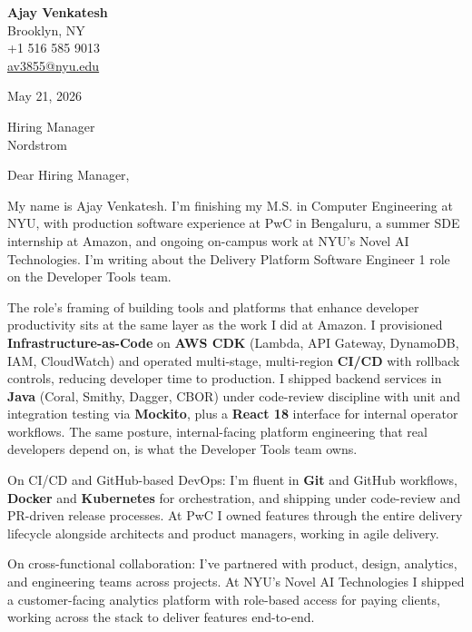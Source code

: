 \documentclass[letterpaper,11pt]{article}
\begin{document}
\begin{flushleft}
\textbf{\large Ajay Venkatesh} \\
Brooklyn, NY \\
+1 516 585 9013 \\
\href{mailto:av3855@nyu.edu}{av3855@nyu.edu}
\end{flushleft}
\vspace{10pt}
May 21, 2026
\vspace{6pt}

Hiring Manager \\
Nordstrom

\vspace{10pt}

Dear Hiring Manager,

My name is Ajay Venkatesh. I'm finishing my M.S. in Computer Engineering at NYU, with production software experience at PwC in Bengaluru, a summer SDE internship at Amazon, and ongoing on-campus work at NYU's Novel AI Technologies. I'm writing about the Delivery Platform Software Engineer 1 role on the Developer Tools team.

The role's framing of building tools and platforms that enhance developer productivity sits at the same layer as the work I did at Amazon. I provisioned \textbf{Infrastructure-as-Code} on \textbf{AWS CDK} (Lambda, API Gateway, DynamoDB, IAM, CloudWatch) and operated multi-stage, multi-region \textbf{CI/CD} with rollback controls, reducing developer time to production. I shipped backend services in \textbf{Java} (Coral, Smithy, Dagger, CBOR) under code-review discipline with unit and integration testing via \textbf{Mockito}, plus a \textbf{React 18} interface for internal operator workflows. The same posture, internal-facing platform engineering that real developers depend on, is what the Developer Tools team owns.

On CI/CD and GitHub-based DevOps: I'm fluent in \textbf{Git} and GitHub workflows, \textbf{Docker} and \textbf{Kubernetes} for orchestration, and shipping under code-review and PR-driven release processes. At PwC I owned features through the entire delivery lifecycle alongside architects and product managers, working in agile delivery.

On cross-functional collaboration: I've partnered with product, design, analytics, and engineering teams across projects. At NYU's Novel AI Technologies I shipped a customer-facing analytics platform with role-based access for paying clients, working across the stack to deliver features end-to-end.
\end{document}
